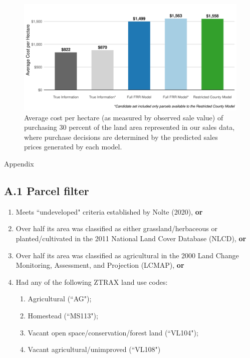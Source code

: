 \documentclass[12pt]{article}
\begin{document}
\begin{figure}[H]
    \centering
    \includegraphics[width=1\textwidth]{exhibits/cost_effective_30by30.png}
    \caption{Average cost per hectare (as measured by observed sale value) of purchasing 30 percent of the land area represented in our sales data, where purchase decisions are determined by the predicted sales prices generated by each model.}
    \label{fig:cost_effective_30by30}
\end{figure}



\newpage
\newpage

\vspace*{200pt}

\begin{huge}
    \begin{center}
        Appendix
    \end{center}
\end{huge}

\newpage

\subsection*{A.1 Parcel filter}

\begin{enumerate}
    \item Meets ``undeveloped" criteria established by Nolte (2020), \textbf{or}
    \item Over half its area was classified as either grassland/herbaceous or planted/cultivated in the 2011 National Land Cover Database (NLCD), \textbf{or}
    \item Over half its area was classified as agricultural in the 2000 Land Change Monitoring, Assessment, and Projection (LCMAP), \textbf{or}
    \item Had any of the following ZTRAX land use codes:
    \begin{enumerate}
        \item Agricultural (``AG");
        \item Homestead (``MS113");
        \item Vacant open space/conservation/forest land (``VL104");
        \item Vacant agricultural/unimproved (``VL108")
    \end{enumerate}
\end{enumerate}
\end{document}
